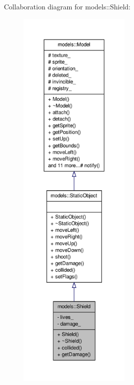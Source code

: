 \-Collaboration diagram for models\-:\-:\-Shield\-:\nopagebreak
\begin{figure}[H]
\begin{center}
\leavevmode
\includegraphics[height=550pt]{da/d83/classmodels_1_1Shield__coll__graph}
\end{center}
\end{figure}
